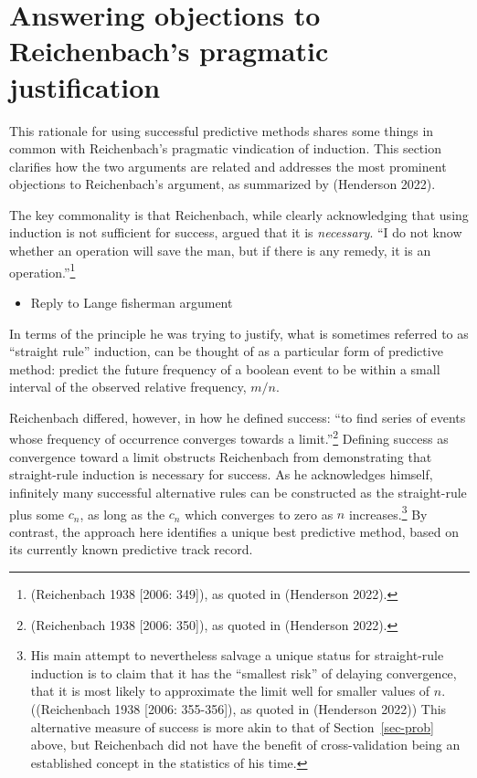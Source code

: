 \documentclass[
  letterpaper,
  DIV=11,
  numbers=noendperiod]{scrartcl}
\providecommand{\tightlist}{%
  \setlength{\itemsep}{0pt}\setlength{\parskip}{0pt}}\usepackage{longtable,booktabs,array}
\theoremstyle{definition}
\theoremstyle{remark}
\begin{document}
\section{Answering objections to Reichenbach's pragmatic
justification}\label{sec-induct}

This rationale for using successful predictive methods shares some
things in common with Reichenbach's pragmatic vindication of induction.
This section clarifies how the two arguments are related and addresses
the most prominent objections to Reichenbach's argument, as summarized
by (Henderson 2022).

The key commonality is that Reichenbach, while clearly acknowledging
that using induction is not sufficient for success, argued that it is
\emph{necessary}. ``I do not know whether an operation will save the
man, but if there is any remedy, it is an operation.''\footnote{(Reichenbach
  1938 {[}2006: 349{]}), as quoted in (Henderson 2022).}

\begin{itemize}
\tightlist
\item
  Reply to Lange fisherman argument
\end{itemize}

In terms of the principle he was trying to justify, what is sometimes
referred to as ``straight rule'' induction, can be thought of as a
particular form of predictive method: predict the future frequency of a
boolean event to be within a small interval of the observed relative
frequency, \(m/n\).

Reichenbach differed, however, in how he defined success: ``to find
series of events whose frequency of occurrence converges towards a
limit.''\footnote{(Reichenbach 1938 {[}2006: 350{]}), as quoted in
  (Henderson 2022).} Defining success as convergence toward a limit
obstructs Reichenbach from demonstrating that straight-rule induction is
necessary for success. As he acknowledges himself, infinitely many
successful alternative rules can be constructed as the straight-rule
plus some \(c_n\), as long as the \(c_n\) which converges to zero as
\(n\) increases.\footnote{His main attempt to nevertheless salvage a
  unique status for straight-rule induction is to claim that it has the
  ``smallest risk'' of delaying convergence, that it is most likely to
  approximate the limit well for smaller values of \(n\).((Reichenbach
  1938 {[}2006: 355-356{]}), as quoted in (Henderson 2022)) This
  alternative measure of success is more akin to that of
  Section~\ref{sec-prob} above, but Reichenbach did not have the benefit
  of cross-validation being an established concept in the statistics of
  his time.} By contrast, the approach here identifies a unique best
predictive method, based on its currently known predictive track record.
\end{document}
